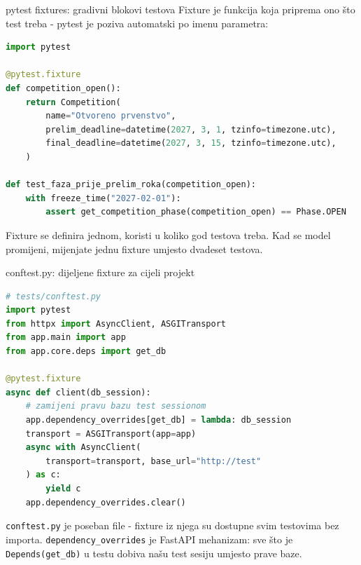\begin{frame}[fragile,shrink=5]{pytest fixtures: gradivni blokovi testova}
Fixture je funkcija koja priprema ono što test treba - pytest je poziva automatski po imenu parametra:

\begin{lstlisting}[language=python]
import pytest

@pytest.fixture
def competition_open():
    return Competition(
        name="Otvoreno prvenstvo",
        prelim_deadline=datetime(2027, 3, 1, tzinfo=timezone.utc),
        final_deadline=datetime(2027, 3, 15, tzinfo=timezone.utc),
    )

def test_faza_prije_prelim_roka(competition_open):
    with freeze_time("2027-02-01"):
        assert get_competition_phase(competition_open) == Phase.OPEN
\end{lstlisting}

\vspace{0.4em}
Fixture se definira jednom, koristi u koliko god testova treba. Kad se model promijeni, mijenjate jednu fixture umjesto dvadeset testova.
\end{frame}

\begin{frame}[fragile,shrink=10]{conftest.py: dijeljene fixture za cijeli projekt}
\begin{lstlisting}[language=python]
# tests/conftest.py
import pytest
from httpx import AsyncClient, ASGITransport
from app.main import app
from app.core.deps import get_db

@pytest.fixture
async def client(db_session):
    # zamijeni pravu bazu test sessionom
    app.dependency_overrides[get_db] = lambda: db_session
    transport = ASGITransport(app=app)
    async with AsyncClient(
        transport=transport, base_url="http://test"
    ) as c:
        yield c
    app.dependency_overrides.clear()
\end{lstlisting}

\vspace{0.4em}
\texttt{conftest.py} je poseban file - fixture iz njega su dostupne svim testovima bez importa. \texttt{dependency\_overrides} je FastAPI mehanizam: sve što je \texttt{Depends(get\_db)} u testu dobiva našu test sesiju umjesto prave baze.
\end{frame}

